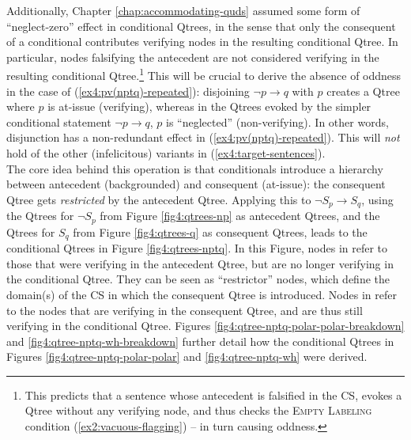 Additionally, Chapter \ref{chap:accommodating-quds} assumed some form of ``neglect-zero'' effect \parencite{Aloni2022, Flachs2023} in conditional Qtrees, in the sense that only the consequent of a conditional contributes verifying nodes in the resulting conditional Qtree. In particular, nodes falsifying the antecedent are not considered verifying in the resulting conditional Qtree.\footnote{This predicts that a sentence whose antecedent is falsified in the CS, evokes a Qtree without any verifying node, and thus checks the \textsc{Empty Labeling} condition (\ref{ex2:vacuous-flagging}) -- in turn causing oddness.} This will be crucial to derive the absence of oddness in the case of (\ref{ex4:pv(nptq)-repeated}): disjoining $\neg p \rightarrow q$ with $p$ creates a Qtree where $p$ is at-issue (verifying), whereas in the Qtrees evoked by the simpler conditional statement $\neg p \rightarrow q$, $p$ is ``neglected'' (non-verifying). In other words, disjunction has a non-redundant effect in (\ref{ex4:pv(nptq)-repeated}). This will \textit{not} hold of the other (infelicitous) variants in (\ref{ex4:target-sentences}).\\


The core idea behind this operation is that conditionals introduce a hierarchy between antecedent (backgrounded) and consequent (at-issue): the consequent Qtree gets \textit{restricted} by the antecedent Qtree. Applying this to $\neg S_p \rightarrow S_q$, using the Qtrees for $\neg S_p$ from Figure \ref{fig4:qtrees-np} as antecedent Qtrees, and the Qtrees for $S_q$ from Figure \ref{fig4:qtrees-q} as consequent Qtrees, leads to the conditional Qtrees in Figure \ref{fig4:qtrees-nptq}. In this Figure, nodes in \setlength{\fboxsep}{1pt} refer to those that were verifying in the antecedent Qtree, but are no longer verifying in the conditional Qtree. They can be seen as ``restrictor'' nodes, which define the domain(s) of the CS in which the consequent Qtree is introduced. Nodes in \setlength{\fboxsep}{1pt} refer to the nodes that are verifying in the consequent Qtree, and are thus still verifying in the conditional Qtree. Figures \ref{fig4:qtree-nptq-polar-polar-breakdown} and \ref{fig4:qtree-nptq-wh-breakdown} further detail how the conditional Qtrees in Figures \ref{fig4:qtree-nptq-polar-polar} and \ref{fig4:qtree-nptq-wh} were derived.

